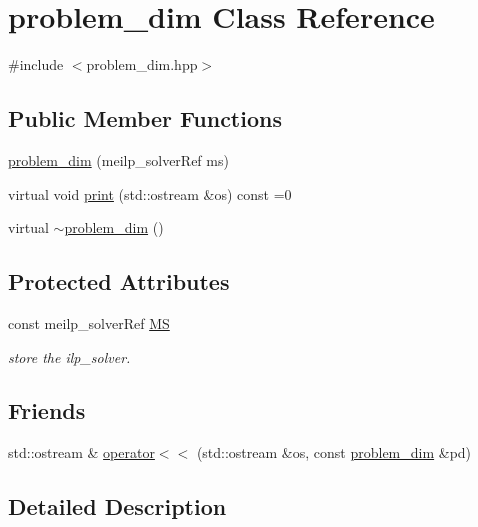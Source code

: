 \hypertarget{classproblem__dim}{}\section{problem\+\_\+dim Class Reference}
\label{classproblem__dim}


{\ttfamily \#include $<$problem\+\_\+dim.\+hpp$>$}

\subsection*{Public Member Functions}
\begin{DoxyCompactItemize}
\item 
\hyperlink{classproblem__dim_ac87600d07dd0aaa1b253baf90e987397}{problem\+\_\+dim} (meilp\+\_\+solver\+Ref ms)
\item 
virtual void \hyperlink{classproblem__dim_a12f1ffb3b227cfaea36e70ce42dd0834}{print} (std\+::ostream \&os) const =0
\item 
virtual \hyperlink{classproblem__dim_ae901efbb896887db42654cea94c2f72e}{$\sim$problem\+\_\+dim} ()
\end{DoxyCompactItemize}
\subsection*{Protected Attributes}
\begin{DoxyCompactItemize}
\item 
const meilp\+\_\+solver\+Ref \hyperlink{classproblem__dim_a0a309c8db18b74b5040da52494e30044}{MS}
\begin{DoxyCompactList}\small\item\em store the ilp\+\_\+solver. \end{DoxyCompactList}\end{DoxyCompactItemize}
\subsection*{Friends}
\begin{DoxyCompactItemize}
\item 
std\+::ostream \& \hyperlink{classproblem__dim_a3cc1760b9078b611daa4df89663d2076}{operator$<$$<$} (std\+::ostream \&os, const \hyperlink{classproblem__dim}{problem\+\_\+dim} \&pd)
\end{DoxyCompactItemize}


\subsection{Detailed Description}


